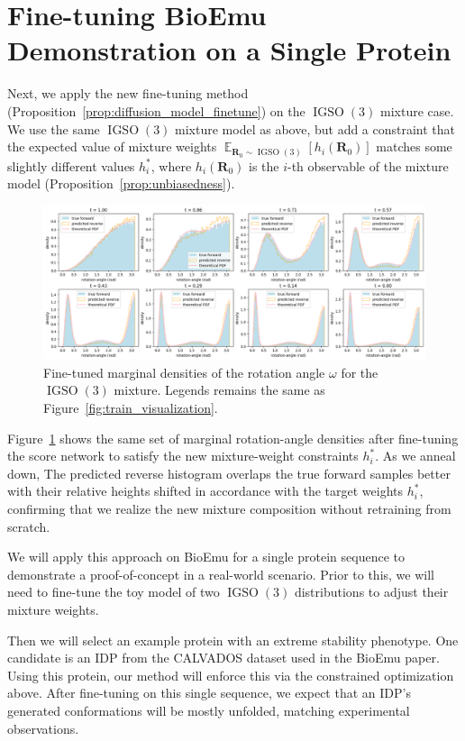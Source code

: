\documentclass{article}
\theoremstyle{plain}
\theoremstyle{definition}
\theoremstyle{remark}
\DeclareMathOperator{\IGSO}{IGSO}
\DeclareMathOperator{\E}{\mathbb{E}}
\begin{document}
\section{Fine-tuning BioEmu Demonstration on a Single Protein}

Next, we apply the new fine-tuning method (Proposition~\ref{prop:diffusion_model_finetune}) on the $\IGSO(3)$ mixture case. We use the same $\IGSO(3)$ mixture model as above, but add a constraint that the expected value of mixture weights $\E_{\mathbf{R}_0\sim\IGSO(3)}[h_i(\mathbf{R}_0)]$ matches some slightly different values $h_i^*$, where $h_i(\mathbf{R}_0)$ is the $i$-th observable of the mixture model (Proposition~\ref{prop:unbiasedness}).

\begin{figure}[!ht]
    \centering
    \includegraphics[width=\linewidth]{figures/finetune_visualization.png}
    \caption{Fine-tuned marginal densities of the rotation angle $\omega$ for the $\IGSO(3)$ mixture. Legends remains the same as Figure~\ref{fig:train_visualization}.}
    \label{fig:finetune_visualization}
\end{figure}

Figure~\ref{fig:finetune_visualization} shows the same set of marginal rotation-angle densities after fine-tuning the score network to satisfy the new mixture-weight constraints $h_i^*$. As we anneal down, The predicted reverse histogram overlaps the true forward samples better with their relative heights shifted in accordance with the target weights $h_i^*$, confirming that we realize the new mixture composition without retraining from scratch.

We will apply this approach on BioEmu for a single protein sequence to demonstrate a proof-of-concept in a real-world scenario. Prior to this, we will need to fine-tune the toy model of two $\IGSO(3)$ distributions to adjust their mixture weights.

Then we will select an example protein with an extreme stability phenotype. One candidate is an IDP from the CALVADOS dataset used in the BioEmu paper. Using this protein, our method will enforce this via the constrained optimization above. After fine-tuning on this single sequence, we expect that an IDP's generated conformations will be mostly unfolded, matching experimental observations.
\end{document}
